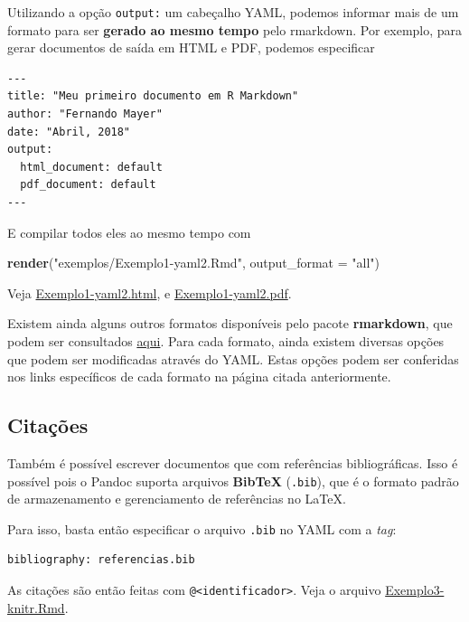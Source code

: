 \documentclass[10pt,a4paper]{book}
\newenvironment{Shaded}{\begin{snugshade}}{\end{snugshade}}
\newcommand{\KeywordTok}[1]{\textcolor[rgb]{0.13,0.29,0.53}{\textbf{#1}}}
\newcommand{\DataTypeTok}[1]{\textcolor[rgb]{0.13,0.29,0.53}{#1}}
\newcommand{\StringTok}[1]{\textcolor[rgb]{0.31,0.60,0.02}{#1}}
\newcommand{\NormalTok}[1]{#1}
\begin{document}
Utilizando a opção \texttt{output:} um cabeçalho YAML, podemos informar
mais de um formato para ser \textbf{gerado ao mesmo tempo} pelo
rmarkdown. Por exemplo, para gerar documentos de saída em HTML e PDF,
podemos especificar

\begin{verbatim}
---
title: "Meu primeiro documento em R Markdown"
author: "Fernando Mayer"
date: "Abril, 2018"
output:
  html_document: default
  pdf_document: default
---
\end{verbatim}

E compilar todos eles ao mesmo tempo com

\begin{Shaded}
\begin{Highlighting}[]
\KeywordTok{render}\NormalTok{(}\StringTok{"exemplos/Exemplo1-yaml2.Rmd"}\NormalTok{, }\DataTypeTok{output_format =} \StringTok{"all"}\NormalTok{)}
\end{Highlighting}
\end{Shaded}

Veja \href{exemplos/Exemplo1-yaml2.html}{Exemplo1-yaml2.html}, e
\href{exemplos/Exemplo1-yaml2.pdf}{Exemplo1-yaml2.pdf}.

Existem ainda alguns outros formatos disponíveis pelo pacote
\textbf{rmarkdown}, que podem ser consultados
\href{https://rmarkdown.rstudio.com/formats.html}{aqui}. Para cada
formato, ainda existem diversas opções que podem ser modificadas através
do YAML. Estas opções podem ser conferidas nos links específicos de cada
formato na página citada anteriormente.

\subsection{Citações}\label{citacoes}

Também é possível escrever documentos que com referências
bibliográficas. Isso é possível pois o Pandoc suporta arquivos
\textbf{BibTeX} (\texttt{.bib}), que é o formato padrão de armazenamento
e gerenciamento de referências no LaTeX.

Para isso, basta então especificar o arquivo \texttt{.bib} no YAML com a
\emph{tag}:

\begin{verbatim}
bibliography: referencias.bib
\end{verbatim}

As citações são então feitas com
\texttt{@\textless{}identificador\textgreater{}}. Veja o arquivo
\href{exemplos/Exemplo3-knitr.Rmd}{Exemplo3-knitr.Rmd}.
\end{document}

